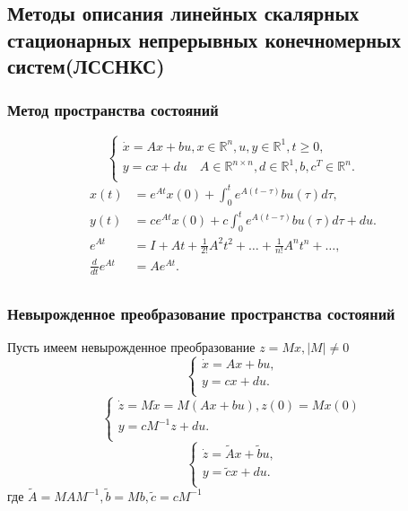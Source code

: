 \documentclass[A4]{article}
\begin{document}
\subsection{Методы описания линейных скалярных стационарных непрерывных конечномерных систем(ЛССНКС)}
\subsubsection{Метод пространства состояний}
\begin{equation}
\left\{\begin{array}{cc}
\dot{x}=Ax+bu,x\in \mathbb{R}^n,u,y\in\mathbb{R}^1,t\ge 0,\\
y=cx+du\quad A\in \mathbb{R}^{n\times n},d\in\mathbb{R}^1,b,c^T\in\mathbb{R}^n.\\
\end{array}\right.
\end{equation}
\begin{equation}
\begin{aligned}
x(t)&=e^{At}x(0)+\int_{0}^{t}e^{A(t-\tau)}bu(\tau)d\tau,\\
y(t)&=ce^{At}x(0)+c\int_{0}^{t}e^{A(t-\tau)}bu(\tau)d\tau+du.\\
e^{At}&=I+At+\frac{1}{2!}A^2t^2+\ldots+\frac{1}{n!}A^nt^n+\ldots,\\
\frac{d}{dt}e^{At}&=Ae^{At}.\\
\end{aligned}
\end{equation}
\subsubsection{Невырожденное преобразование пространства состояний}
Пусть имеем невырожденное преобразование $z=Mx,|M|\ne 0$\\
\begin{equation}
\left\{\begin{array}{cc}
\dot{x}=Ax+bu,\\
y=cx+du.\\
\end{array}\right.
\end{equation}
\begin{equation}
\left\{\begin{array}{cc}
\dot{z}=M\dot{x}=M(Ax+bu),z(0)=Mx(0)\\
y=cM^{-1}z+du.\\
\end{array}\right.
\end{equation}
\begin{equation}
\left\{\begin{array}{cc}
\dot{z}=\tilde{A}x+\tilde{b}u,\\
y=\tilde{c}x+du.\\
\end{array}\right.
\end{equation}
где $\tilde{A}=MAM^{-1},\tilde{b}=Mb,\tilde{c}=cM^{-1}$
\end{document}
